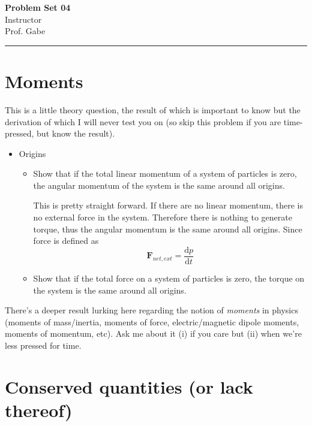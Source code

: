 \documentclass[12pt]{article}
\newcommand{\dydx}[2]{\frac{\text{d} #1}{\text{d} #2}}
\newif\ifshow
\begin{document}
\begin{center}
\ifshow
  \textbf{\Large Problem Set 04 Solution}\\
\else
  \textbf{\Large Problem Set 04}\\
\fi
Instructor \\ Prof. Gabe\\
\end{center}

\hrule

\vspace{0.2cm}

\section{Moments}

This is a little theory question, the result of which is important to know but the derivation of which I will never test you on (so skip this problem if you are time-pressed, but know the result).

\begin{itemize}
    \item[KK 7.1] Origins
    \begin{itemize}
    \item[(a)] Show that if the total linear momentum of a system of particles is zero, the angular momentum of the system is the same around all origins.

    This is pretty straight forward. If there are no linear momentum, there is no external force in the system. Therefore there is nothing to generate torque, thus the angular momentum is the same around all origins. Since force is defined as
    \[
    \mathbf{F}_{net,ext} = \dydx{p}{t}
    \]
    \item[(b)] Show that if the total force on a system of particles is zero, the torque on the system is the same around all origins.
\end{itemize}
\end{itemize}

There’s a deeper result lurking here regarding the notion of \textit{moments} in physics (moments of mass/inertia, moments of force, electric/magnetic dipole moments, moments of momentum, etc). Ask me about it (i) if you care but (ii) when we’re less pressed for time.

\newpage
\section{Conserved quantities (or lack thereof)}
\end{document}
